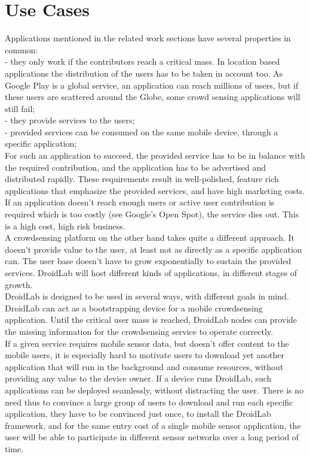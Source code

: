 \documentclass[conference,letterpaper]{IEEEtran}
\begin{document}
\section{Use Cases}
Applications mentioned in the related work sections have several properties in common:\\
- they only work if the contributors reach a critical mass. In location based applications the distribution of the users has to be taken in account too. As Google Play is a global service, an application can reach millions of users, but if these users are scattered around the Globe, some crowd sensing applications will still fail;\\
- they provide services to the users;\\
- provided services can be consumed on the same mobile device, through a specific application;\\
\indent For such an application to succeed, the provided service has to be in balance with the required contribution, and the application has to be advertised and distributed rapidly. These requirements result in well-polished, feature rich applications that emphasize the provided services, and have high marketing costs. If an application doesn't reach enough users or active user contribution is required which is too costly (see Google's Open Spot), the service dies out. This is a high cost, high risk business.\\
\indent A crowdsensing platform on the other hand takes quite a different approach. It doesn't provide value to the user, at least not as directly as a specific application can. The user base doesn't have to grow exponentially to sustain the provided services. DroidLab will host different kinds of applications, in different stages of growth.\\
\indent DroidLab is designed to be used in several ways, with different goals in mind. DroidLab can act as a bootstrapping device for a mobile crowdsensing application. Until the critical user mass is reached, DroidLab nodes can provide the missing information for the crowdsensing service to operate correctly.\\
\indent If a given service requires mobile sensor data, but doesn't offer content to the mobile users, it is especially hard to motivate users to download yet another application that will run in the background and consume resources, without providing any value to the device owner. If a device runs DroidLab, such applications can be deployed seamlessly, without distracting the user. There is no need thus to convince a large group of users to download and run each specific application, they have to be convinced just once, to install the DroidLab framework, and for the same entry cost of a single mobile sensor application, the user will be able to participate in different sensor networks over a long period of time. \\
\end{document}
